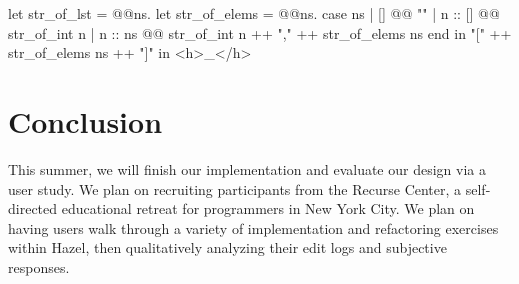 \documentclass[runningheads]{llncs}
\newcommand{\Hazel}{\textsf{Hazel}\xspace}
\begin{document}
\begin{hazel}
let str_of_lst =
	@\lam @ns.{
		let str_of_elems = 
			@\lam @ns.{
				case ns
				| []      @\casearrow @ ""                                     
				| n :: [] @\casearrow @ str_of_int n                           
				| n :: ns @\casearrow @ str_of_int n ++ "," ++ str_of_elems ns 
				end
			}
		in
		"[" ++ str_of_elems ns ++ "]"
	}
in
<h>_</h>
\end{hazel}


%	
%

\section{Conclusion} \label{sec:conclusion}

This summer, we will finish our implementation and evaluate our design via a user study.
We plan on recruiting participants from the Recurse Center, a self-directed educational retreat for programmers in New York City. We plan on having users walk through a variety of implementation and refactoring exercises within \Hazel, then qualitatively analyzing their edit logs and subjective responses.
\end{document}

